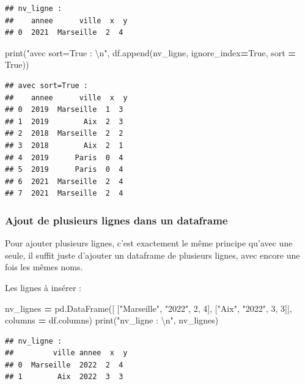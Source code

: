 \documentclass[12pt,]{book}
\newenvironment{Shaded}{\begin{snugshade}}{\end{snugshade}}
\newcommand{\DecValTok}[1]{\textcolor[rgb]{0.00,0.00,0.81}{#1}}
\newcommand{\CharTok}[1]{\textcolor[rgb]{0.31,0.60,0.02}{#1}}
\newcommand{\StringTok}[1]{\textcolor[rgb]{0.31,0.60,0.02}{#1}}
\newcommand{\VariableTok}[1]{\textcolor[rgb]{0.00,0.00,0.00}{#1}}
\newcommand{\OperatorTok}[1]{\textcolor[rgb]{0.81,0.36,0.00}{\textbf{#1}}}
\newcommand{\BuiltInTok}[1]{#1}
\newcommand{\NormalTok}[1]{#1}
\numberwithin{equation}{section}
\numberwithin{countremarque}{section}
\begin{document}
\begin{lstlisting}
## nv_ligne : 
##    annee      ville  x  y
## 0  2021  Marseille  2  4
\end{lstlisting}

\begin{Shaded}
\begin{Highlighting}[]
\BuiltInTok{print}\NormalTok{(}\StringTok{"avec sort=True : }\CharTok{\textbackslash{}n}\StringTok{"}\NormalTok{, }
\NormalTok{  df.append(nv_ligne, ignore_index}\OperatorTok{=}\VariableTok{True}\NormalTok{, sort }\OperatorTok{=} \VariableTok{True}\NormalTok{))}
\end{Highlighting}
\end{Shaded}

\begin{lstlisting}
## avec sort=True : 
##    annee      ville  x  y
## 0  2019  Marseille  1  3
## 1  2019        Aix  2  3
## 2  2018  Marseille  2  2
## 3  2018        Aix  2  1
## 4  2019      Paris  0  4
## 5  2019      Paris  0  4
## 6  2021  Marseille  2  4
## 7  2021  Marseille  2  4
\end{lstlisting}

\subsubsection{Ajout de plusieurs lignes dans un
dataframe}\label{ajout-de-plusieurs-lignes-dans-un-dataframe}

Pour ajouter plusieurs lignes, c'est exactement le même principe qu'avec
une seule, il suffit juste d'ajouter un dataframe de plusieurs lignes,
avec encore une fois les mêmes noms.

Les lignes à insérer :

\begin{Shaded}
\begin{Highlighting}[]
\NormalTok{nv_lignes }\OperatorTok{=}\NormalTok{ pd.DataFrame([}
\NormalTok{    [}\StringTok{"Marseille"}\NormalTok{, }\StringTok{"2022"}\NormalTok{, }\DecValTok{2}\NormalTok{, }\DecValTok{4}\NormalTok{],}
\NormalTok{    [}\StringTok{"Aix"}\NormalTok{, }\StringTok{"2022"}\NormalTok{, }\DecValTok{3}\NormalTok{, }\DecValTok{3}\NormalTok{]],}
\NormalTok{    columns }\OperatorTok{=}\NormalTok{ df.columns)}
\BuiltInTok{print}\NormalTok{(}\StringTok{"nv_ligne : }\CharTok{\textbackslash{}n}\StringTok{"}\NormalTok{, nv_lignes)}
\end{Highlighting}
\end{Shaded}

\begin{lstlisting}
## nv_ligne : 
##         ville annee  x  y
## 0  Marseille  2022  2  4
## 1        Aix  2022  3  3
\end{lstlisting}
\end{document}
